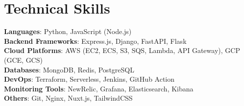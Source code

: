 \documentclass[letterpaper,11pt]{article}
\begin{document}
\section{Technical Skills}
  \begin{itemize}[leftmargin=*, label={}]
    \small{\vspace{-1pt}\item{
      \textbf{Languages}{: Python, JavaScript (Node.js)} \\
      \textbf{Backend Frameworks}{: Express.js, Django, FastAPI, Flask} \\
      \textbf{Cloud Platforms}{: AWS (EC2, ECS, S3, SQS, Lambda, API Gateway), GCP (GCE, GCS)} \\
      \textbf{Databases}{: MongoDB, Redis, PostgreSQL} \\
      \textbf{DevOps}{: Terraform, Serverless, Jenkins, GitHub Action} \\
      \textbf{Monitoring Tools}{: NewRelic, Grafana, Elasticsearch, Kibana} \\
      \textbf{Others}{: Git, Nginx, Nuxt.js, TailwindCSS}
    }}
  \end{itemize}
\end{document}
